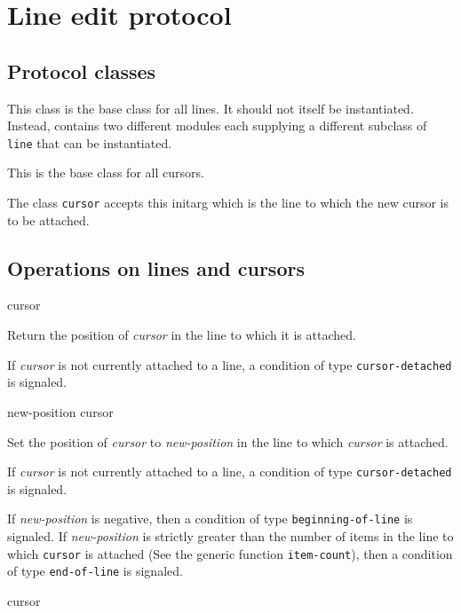 \section{Line edit protocol}
\label{sec-edit-protocol}

\subsection{Protocol classes}


This class is the base class for all lines.  It should not itself be
instantiated.  Instead, \sysname{} contains two different modules
each supplying a different subclass of \texttt{line} that can be
instantiated.


This is the base class for all cursors.


The class \texttt{cursor} accepts this initarg which is the line to
which the new cursor is to be attached.

\subsection{Operations on lines and cursors}

 {cursor}

Return the position of \textit{cursor} in the line to which it is
attached.

If \textit{cursor} is not currently attached to a line, a condition
of type \texttt{cursor-detached} is signaled.

 {new-position cursor}

Set the position of \textit{cursor} to \textit{new-position} in the line
to which \textit{cursor} is attached.

If \textit{cursor} is not currently attached to a line, a condition
of type \texttt{cursor-detached} is signaled.

If \textit{new-position} is negative, then a condition of type
\texttt{beginning-of-line} is signaled.  If \textit{new-position} is
strictly greater than the number of items in the line to which
\texttt{cursor} is attached (See the generic function
\texttt{item-count}), then a condition of type \texttt{end-of-line} is
signaled.

 {cursor}


